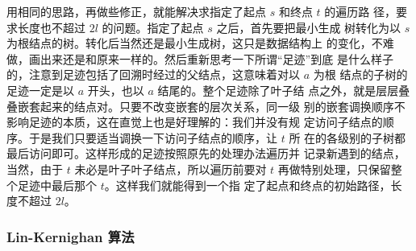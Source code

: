 \documentclass[cs4size,a4paper,adobefonts]{ctexart}
\begin{document}
用相同的思路，再做些修正，就能解决求指定了起点 $s$ 和终点 $t$ 的遍历路
径，要求长度也不超过 $2l$ 的问题。指定了起点 $s$ 之后，首先要把最小生成
树转化为以 $s$ 为根结点的树。转化后当然还是最小生成树，这只是数据结构上
的变化，不难做，画出来还是和原来一样的。然后重新思考一下所谓“足迹”到底
是什么样子的，注意到足迹包括了回溯时经过的父结点，这意味着对以 $a$ 为根
结点的子树的足迹一定是以 $a$ 开头，也以 $a$ 结尾的。整个足迹除了叶子结
点之外，就是层层叠叠嵌套起来的结点对。只要不改变嵌套的层次关系，同一级
别的嵌套调换顺序不影响足迹的本质，这在直觉上也是好理解的：我们并没有规
定访问子结点的顺序。于是我们只要适当调换一下访问子结点的顺序，让 $t$ 所
在的各级别的子树都最后访问即可。这样形成的足迹按照原先的处理办法遍历并
记录新遇到的结点，当然，由于 $t$ 未必是叶子叶子结点，所以遍历前要对
$t$ 再做特别处理，只保留整个足迹中最后那个 $t$。这样我们就能得到一个指
定了起点和终点的初始路径，长度不超过 $2l$。

\subsubsection{Lin-Kernighan 算法}

 

\end{document}
